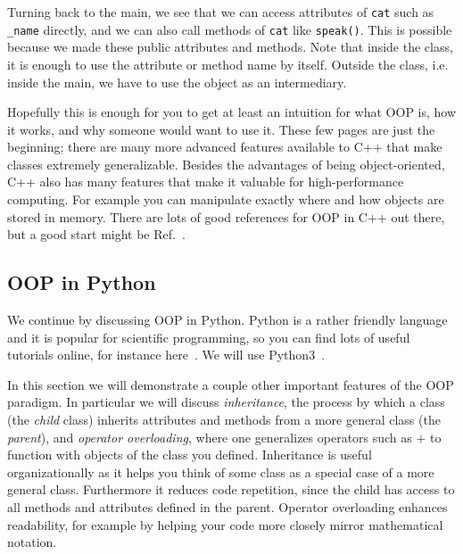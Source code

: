 Turning back to the main, we see that we can access attributes of
\texttt{cat} such as \texttt{\_name} directly, and we can also call
methods of \texttt{cat} like \texttt{speak()}. This is possible because
we made these public attributes and methods. Note that inside the class,
it is enough to use the attribute or method name by itself. Outside the
class, i.e. inside the main, we have to use the object as an 
intermediary.

Hopefully this is enough for you to get at least an intuition for
what OOP is, how it works, and why someone would want to use it. These
few pages are just the beginning; there are many more advanced
features available to C++ that make classes extremely generalizable.
Besides the advantages of being object-oriented, C++ also has many
features that make it valuable for high-performance computing.
For example you can manipulate exactly where and how objects
are stored in memory. There are lots of good references for OOP
in C++ out there, but a good start might be Ref.~\cite{tp:cpp}.\\




\subsection{OOP in Python}

We continue by discussing OOP in Python. Python is a rather friendly language
and it is popular for scientific programming, so you can find lots of useful
tutorials online, for instance here~\cite{pythonOOP}. We will use
Python3~\cite{python3}.

In this section we will demonstrate
a couple other important features of the OOP paradigm. In particular we will
discuss {\it inheritance}, the process by which a
class (the {\it child} class) inherits attributes and methods
from a more general class (the {\it parent}), and
{\it operator overloading},  where one generalizes 
operators such as $+$ to function with objects of the class you defined.
Inheritance is useful organizationally as it helps you think of some class
as a special case of a more general class. Furthermore it reduces code
repetition, since the child has access to all methods and attributes defined in
the parent. Operator overloading enhances readability, for example by
helping your code more closely mirror mathematical notation.\\

